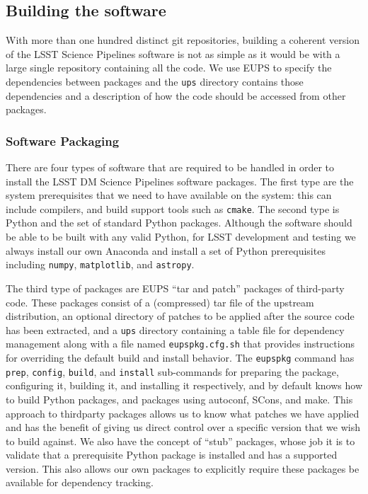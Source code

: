 \subsection{Building the software}
\label{sec:buildsw}

With more than one hundred distinct git repositories, building a coherent version of the LSST Science Pipelines software is not as simple as it would be with a large single repository containing all the code.
We use EUPS to specify the dependencies between packages and the \texttt{ups} directory contains those dependencies and a description of how the code should be accessed from other packages.

\subsubsection{Software Packaging}

There are four types of software that are required to be handled in order to install the LSST DM Science Pipelines software packages.
The first type are the system prerequisites that we need to have available on the system: this can include compilers, and build support tools such as \texttt{cmake}.
The second type is Python and the set of standard Python packages.
Although the software should be able to be built with any valid Python, for LSST development and testing we always install our own Anaconda and install a set of Python prerequisites including \texttt{numpy}, \texttt{matplotlib}, and \texttt{astropy}\cite{2018arXiv180102634T}.

The third type of packages are EUPS ``tar and patch'' packages of third-party code.
These packages consist of a (compressed) tar file of the upstream distribution, an optional directory of patches to be applied after the source code has been extracted, and a \texttt{ups} directory containing a table file for dependency management along with a file named \texttt{eupspkg.cfg.sh} that provides instructions for overriding the default build and install behavior.
The \texttt{eupspkg} command has \texttt{prep}, \texttt{config}, \texttt{build}, and \texttt{install} sub-commands for preparing the package, configuring it, building it, and installing it respectively, and by default knows how to build Python packages, and packages using autoconf, SCons, and make.
This approach to thirdparty packages allows us to know what patches we have applied and has the benefit of giving us direct control over a specific version that we wish to build against.
We also have the concept of ``stub'' packages, whose job it is to validate that a prerequisite Python package is installed and has a supported version.
This also allows our own packages to explicitly require these packages be available for dependency tracking.

